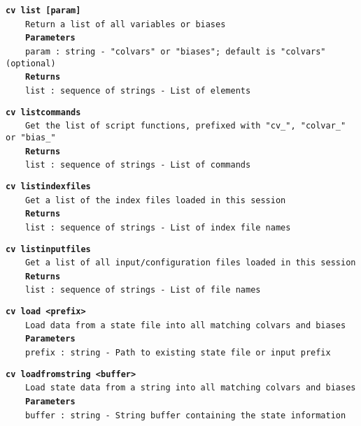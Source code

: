 \begin{mdexampleinput}{}
\texttt{\textbf{cv list [param]}}
\\
\-~~~~\texttt{Return a list of all variables or biases}
\\
\-~~~~\texttt{\textbf{Parameters}}
\\
\-~~~~\texttt{param : string - "colvars" or "biases"; default is "colvars" (optional)}
\\
\-~~~~\texttt{\textbf{Returns}}
\\
\-~~~~\texttt{list : sequence of strings - List of elements}
\end{mdexampleinput}
\begin{mdexampleinput}{}
\texttt{\textbf{cv listcommands}}
\\
\-~~~~\texttt{Get the list of script functions, prefixed with "cv\_", "colvar\_" or "bias\_"}
\\
\-~~~~\texttt{\textbf{Returns}}
\\
\-~~~~\texttt{list : sequence of strings - List of commands}
\end{mdexampleinput}
\begin{mdexampleinput}{}
\texttt{\textbf{cv listindexfiles}}
\\
\-~~~~\texttt{Get a list of the index files loaded in this session}
\\
\-~~~~\texttt{\textbf{Returns}}
\\
\-~~~~\texttt{list : sequence of strings - List of index file names}
\end{mdexampleinput}
\begin{mdexampleinput}{}
\texttt{\textbf{cv listinputfiles}}
\\
\-~~~~\texttt{Get a list of all input/configuration files loaded in this session}
\\
\-~~~~\texttt{\textbf{Returns}}
\\
\-~~~~\texttt{list : sequence of strings - List of file names}
\end{mdexampleinput}
\begin{mdexampleinput}{}
\texttt{\textbf{cv load <prefix>}}
\\
\-~~~~\texttt{Load data from a state file into all matching colvars and biases}
\\
\-~~~~\texttt{\textbf{Parameters}}
\\
\-~~~~\texttt{prefix : string - Path to existing state file or input prefix}
\end{mdexampleinput}
\begin{mdexampleinput}{}
\texttt{\textbf{cv loadfromstring <buffer>}}
\\
\-~~~~\texttt{Load state data from a string into all matching colvars and biases}
\\
\-~~~~\texttt{\textbf{Parameters}}
\\
\-~~~~\texttt{buffer : string - String buffer containing the state information}
\end{mdexampleinput}
